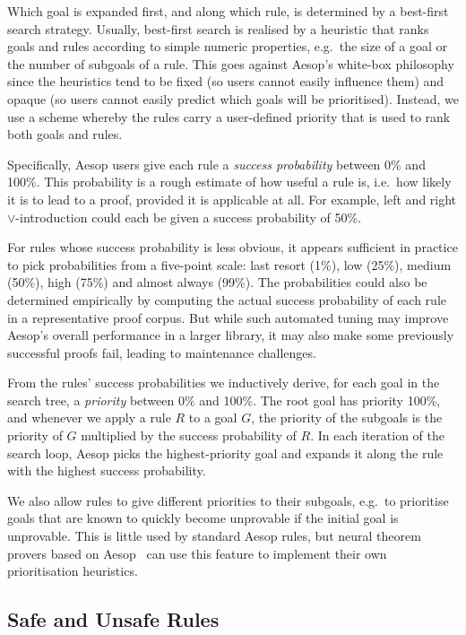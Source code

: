 Which goal is expanded first, and along which rule, is determined by a best-first search strategy.
Usually, best-first search is realised by a heuristic that ranks goals and rules according to simple numeric properties, e.g.\ the size of a goal or the number of subgoals of a rule.
This goes against Aesop's white-box philosophy since the heuristics tend to be fixed (so users cannot easily influence them) and opaque (so users cannot easily predict which goals will be prioritised).
Instead, we use a scheme whereby the rules carry a user-defined priority that is used to rank both goals and rules.

Specifically, Aesop users give each rule a \emph{success probability} between 0\% and 100\%.
This probability is a rough estimate of how useful a rule is, i.e.\ how likely it is to lead to a proof, provided it is applicable at all.
For example, left and right $∨$-introduction could each be given a success probability of 50\%.

For rules whose success probability is less obvious, it appears sufficient in practice to pick probabilities from a five-point scale: last resort (1\%), low (25\%), medium (50\%), high (75\%) and almost always (99\%).
The probabilities could also be determined empirically by computing the actual success probability of each rule in a representative proof corpus.
But while such automated tuning may improve Aesop's overall performance in a larger library, it may also make some previously successful proofs fail, leading to maintenance challenges.

From the rules' success probabilities we inductively derive, for each goal in the search tree, a \emph{priority} between 0\% and 100\%.
The root goal has priority 100\%, and whenever we apply a rule $R$ to a goal $G$, the priority of the subgoals is the priority of $G$ multiplied by the success probability of $R$.
In each iteration of the search loop, Aesop picks the highest-priority goal and expands it along the rule with the highest success probability.

We also allow rules to give different priorities to their subgoals, e.g.\ to prioritise goals that are known to quickly become unprovable if the initial goal is unprovable.
This is little used by standard Aesop rules, but neural theorem provers based on Aesop~\cite{LeanDojo,ABEL} can use this feature to implement their own prioritisation heuristics.

\subsection{Safe and Unsafe Rules}%
\label{sec:aesop:safe}

